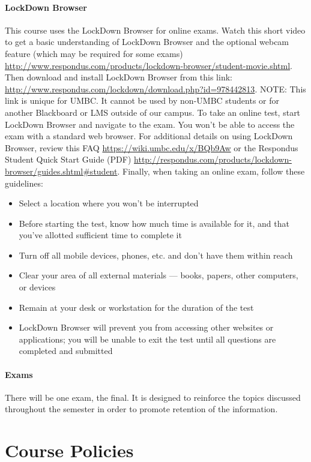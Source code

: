 \documentclass[letter,11pt]{article}
\begin{document}
\paragraph{LockDown Browser}This course uses the LockDown Browser for online exams. Watch this short video to get a basic understanding of LockDown Browser and the optional webcam feature (which may be required for some exams) \url{http://www.respondus.com/products/lockdown-browser/student-movie.shtml}. Then download and install LockDown Browser from this link: \url{http://www.respondus.com/lockdown/download.php?id=978442813}. NOTE: This link is unique for UMBC. It cannot be used by non-UMBC students or for another Blackboard or LMS outside of our campus. To take an online test, start LockDown Browser and navigate to the exam. You won't be able to access the exam with a standard web browser. For additional details on using LockDown Browser, review this FAQ \url{https://wiki.umbc.edu/x/BQb9Aw} or the Respondus Student Quick Start Guide (PDF) \url{http://respondus.com/products/lockdown-browser/guides.shtml#student}. Finally, when taking an online exam, follow these guidelines:
\begin{itemize}
\item Select a location where you won't be interrupted
\item Before starting the test, know how much time is available for it, and that you've allotted sufficient time to complete it
\item Turn off all mobile devices, phones, etc. and don't have them within reach
\item Clear your area of all external materials — books, papers, other computers, or devices
\item Remain at your desk or workstation for the duration of the test
\item LockDown Browser will prevent you from accessing other websites or applications; you will be unable to exit the test until all questions are completed and submitted
\end{itemize}

\paragraph{Exams}There will be one exam, the final. It is designed to reinforce the topics discussed throughout the semester in order to promote retention of the information.

\section*{Course Policies}
\end{document}
